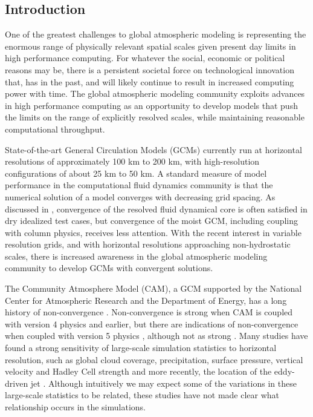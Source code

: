 \subsection{Introduction}
One of the greatest challenges to global atmospheric modeling is representing the enormous range of physically relevant spatial scales given present day limits in high performance computing. For whatever the social, economic or political reasons may be, there is a persistent societal force on technological innovation that, has in the past, and will likely continue to result in increased computing power with time. The global atmospheric modeling community exploits advances in high performance computing as an opportunity to develop models that push the limits on the range of explicitly resolved scales, while maintaining reasonable computational throughput.

State-of-the-art General Circulation Models (GCMs) currently run at horizontal resolutions of approximately 100 km to 200 km, with high-resolution configurations of about 25 km to 50 km. A standard measure of model performance in the computational fluid dynamics community is that the numerical solution of a model converges with decreasing grid spacing. As discussed in \cite{W2008TELLUS}, convergence of the resolved fluid dynamical core is often satisfied in dry idealized test cases, but convergence of the moist GCM, including coupling with column physics, receives less attention. With the recent interest in variable resolution grids, and with horizontal resolutions approaching non-hydrostatic scales, there is increased awareness in the global atmospheric modeling community to develop GCMs with convergent solutions.

The Community Atmosphere Model (CAM), a GCM supported by the National Center for Atmospheric Research and the Department of Energy, has a long history of non-convergence \citep{KW1991JGR,WETAL1995CD,W1999T,W2008TELLUS,LETAL2011TELLUS,RJ2011MWR,RETAL2012ASL,OETAL2013JCLIM,RETAL2013JCLIM,ZetAl2014JCb,LETAL2015JCLIM}. Non-convergence is strong when CAM is coupled with version 4 physics and earlier, but there are indications of non-convergence when coupled with version 5 physics \citep{RETAL2012ASL,RM2016GRL}, although not as strong \citep{OETAL2013JCLIM,ZetAl2014JCb}. Many studies have found a strong sensitivity of large-scale simulation statistics to horizontal resolution, such as global cloud coverage, precipitation, surface pressure, vertical velocity and Hadley Cell strength \citep{KW1991JGR,WETAL1995CD,W2008TELLUS,LETAL2011TELLUS,RETAL2013JCLIM,OETAL2013JCLIM,ZetAl2014JCb} and more recently, the location of the eddy-driven jet \citep{LETAL2015JCLIM}. Although intuitively we may expect some of the variations in these large-scale statistics to be related, these studies have not made clear what relationship occurs in the simulations. 

